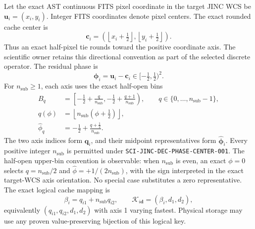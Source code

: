 Let the exact AST continuous FITS pixel coordinate in the target JINC WCS be
$\boldsymbol{u}_i=(x_i,y_i)$.  Integer FITS coordinates denote pixel centers.
The exact rounded cache center is
\begin{equation}
  \boldsymbol{c}_i=
  \left(\left\lfloor x_i+\tfrac12\right\rfloor,
        \left\lfloor y_i+\tfrac12\right\rfloor\right).
  \label{eq:rounded-center}
\end{equation}
Thus an exact half-pixel tie rounds toward the positive coordinate axis.  The
scientific owner retains this directional convention as part of the selected
discrete operator.  The
residual phase is
\begin{equation}
  \boldsymbol{\phi}_i=\boldsymbol{u}_i-\boldsymbol{c}_i
  \in[-\tfrac12,\tfrac12)^2.
  \label{eq:residual-phase}
\end{equation}
For $n_{\mathrm{sub}}\ge1$, each axis uses the exact half-open bins
\begin{align}
  B_q & =\left[-\tfrac12+\frac{q}{n_{\mathrm{sub}}},
                    -\tfrac12+\frac{q+1}{n_{\mathrm{sub}}}\right),
        \qquad q\in\{0,\ldots,n_{\mathrm{sub}}-1\},
        \label{eq:phase-bin}\\
  q(\phi) & =\left\lfloor
          n_{\mathrm{sub}}(\phi+\tfrac12)\right\rfloor,
        \label{eq:phase-index}\\
  \widehat{\phi}_q &=-\tfrac12+
          \frac{q+\tfrac12}{n_{\mathrm{sub}}}.
        \label{eq:phase-representative}
\end{align}
The two axis indices form $\boldsymbol{q}_i$, and their midpoint
representatives form $\widehat{\boldsymbol{\phi}}_i$.  Every positive integer
$n_{\mathrm{sub}}$ is permitted under
\texttt{SCI-JINC-DEC-PHASE-CENTER-001}.  The half-open upper-bin convention is observable:
when $n_{\mathrm{sub}}$ is even, an exact $\phi=0$ selects
$q=n_{\mathrm{sub}}/2$ and
$\widehat\phi=+1/(2n_{\mathrm{sub}})$, with the sign interpreted in the exact
target-WCS axis orientation.  No special case substitutes a zero
representative.
The exact logical cache mapping is
\begin{equation}
  \beta_i=q_{i1}+n_{\mathrm{sub}}q_{i2},\qquad
  \mathcal{K}_{i\boldsymbol d}=(\beta_i,d_1,d_2),
  \label{eq:phase-cache-index}
\end{equation}
equivalently $(q_{i1},q_{i2},d_1,d_2)$ with axis 1 varying fastest. Physical
storage may use any proven value-preserving bijection of this logical key.

